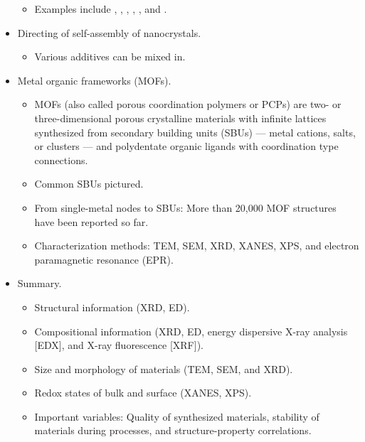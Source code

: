 \documentclass[../notes.tex]{subfiles}
\begin{document}
\begin{itemize}
\begin{itemize}
        \item Examples include , , , , , and .
    \end{itemize}
    \item Directing of self-assembly of nanocrystals.
    \begin{itemize}
        \item Various additives can be mixed in.
    \end{itemize}
    \item Metal organic frameworks (MOFs).
    \begin{itemize}
        \item MOFs (also called porous coordination polymers or PCPs) are two- or three-dimensional porous crystalline materials with infinite lattices synthesized from secondary building units (SBUs) --- metal cations, salts, or clusters --- and polydentate organic ligands with coordination type connections.
        \item Common SBUs pictured.
        \item From single-metal nodes to SBUs: More than 20,000 MOF structures have been reported so far.
        \item Characterization methods: TEM, SEM, XRD, XANES, XPS, and electron paramagnetic resonance (EPR).
    \end{itemize}
    \item Summary.
    \begin{itemize}
        \item Structural information (XRD, ED).
        \item Compositional information (XRD, ED, energy dispersive X-ray analysis [EDX], and X-ray fluorescence [XRF]).
        \item Size and morphology of materials (TEM, SEM, and XRD).
        \item Redox states of bulk and surface (XANES, XPS).
        \item Important variables: Quality of synthesized materials, stability of materials during processes, and structure-property correlations.
    \end{itemize}
\end{itemize}
\end{document}
